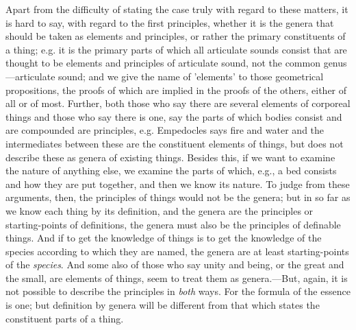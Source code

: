 Apart from the difficulty of stating the case truly with regard to these matters, it is hard to say, with regard to the first principles, whether it is the genera that should be taken as elements and principles, or rather the primary constituents of a thing; e.g. it is the primary parts of which all articulate sounds consist that are thought to be elements and principles of articulate sound, not the common genus—articulate sound; and we give the name of 'elements' to those geometrical propositions, the proofs of which are implied in the proofs of the others, either of all or of most. Further, both those who say there are several elements of corporeal things and those who say there is one, say the parts of which bodies consist and are compounded are principles, e.g. Empedocles says fire and water and the intermediates between these are the constituent elements of things, but does not describe these as genera of existing things. Besides this, if we want to examine the nature of anything else, we examine the parts of which, e.g., a bed consists and how they are put together, and then we know its nature. To judge from these arguments, then, the principles of things would not be the genera; but in so far as we know each thing by its definition, and the genera are the principles or starting-points of definitions, the genera must also be the principles of definable things. And if to get the knowledge of things is to get the knowledge of the species according to which they are named, the genera are at least starting-points of the \emph{species}. And some also of those who say unity and being, or the great and the small, are elements of things, seem to treat them as genera.—But, again, it is not possible to describe the principles in \emph{both} ways. For the formula of the essence is one; but definition by genera will be different from that which states the constituent parts of a thing.

